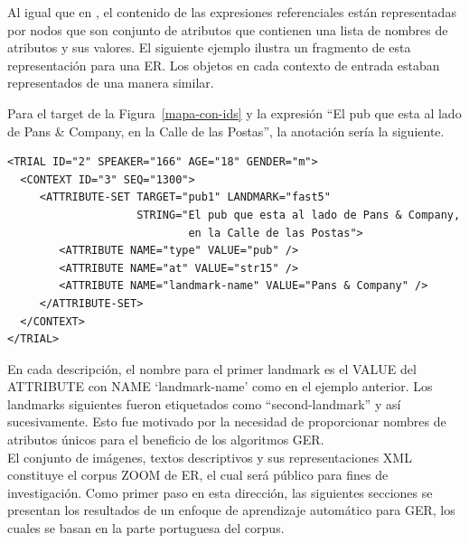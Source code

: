 Al igual que en \cite{tuna-corpus}, el contenido de las expresiones referenciales est\'an representadas por nodos que son conjunto de atributos que contienen una lista de nombres de atributos y sus valores. El siguiente ejemplo ilustra un fragmento de esta representaci\'on para una ER. Los objetos en cada contexto de entrada estaban representados de una manera similar.

Para el target de la Figura~\ref{mapa-con-ids} y la expresi\'on ``El pub que esta al lado de Pans \& Company, en la
Calle de las Postas'', la anotaci\'on ser\'ia la siguiente.
\begin{verbatim}
<TRIAL ID="2" SPEAKER="166" AGE="18" GENDER="m">
  <CONTEXT ID="3" SEQ="1300">
     <ATTRIBUTE-SET TARGET="pub1" LANDMARK="fast5" 
                    STRING="El pub que esta al lado de Pans & Company, 
                            en la Calle de las Postas">
        <ATTRIBUTE NAME="type" VALUE="pub" />
        <ATTRIBUTE NAME="at" VALUE="str15" />
        <ATTRIBUTE NAME="landmark-name" VALUE="Pans & Company" />
     </ATTRIBUTE-SET>
  </CONTEXT>
</TRIAL>	
\end{verbatim}




En cada descripci\'on, el nombre para el primer landmark es el VALUE del ATTRIBUTE con NAME `landmark-name' como en el ejemplo anterior. Los landmarks siguientes fueron etiquetados como ``second-landmark'' y as\'{i} sucesivamente. Esto fue motivado por la necesidad de proporcionar nombres de atributos \'unicos para el beneficio de los algoritmos GER.\\

El conjunto de im\'agenes, textos descriptivos y sus representaciones XML constituye el corpus ZOOM de ER, el cual ser\'a p\'ublico para fines de investigaci\'on. Como primer paso en esta direcci\'on, las siguientes secciones se presentan los resultados de un enfoque de aprendizaje autom\'atico para GER, los cuales se basan en la parte portuguesa del corpus.


